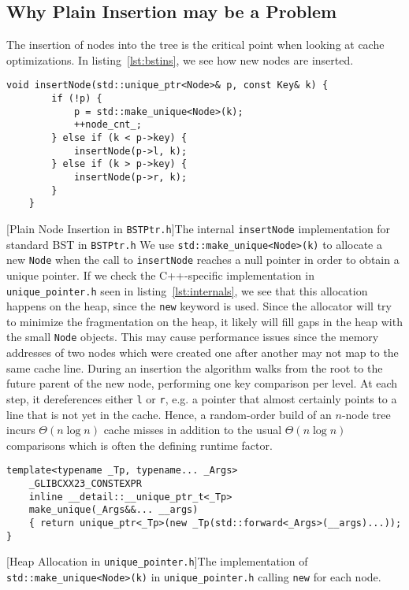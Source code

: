 \documentclass{article}
\begin{document}
\subsection{Why Plain Insertion may be a Problem}
The insertion of nodes into the tree is the critical point when looking at cache optimizations. In listing~\ref{lst:bstins}, we see how new nodes are inserted. 
\begin{lstlisting}
void insertNode(std::unique_ptr<Node>& p, const Key& k) {
        if (!p) {
            p = std::make_unique<Node>(k);
            ++node_cnt_;                         
        } else if (k < p->key) {
            insertNode(p->l, k);
        } else if (k > p->key) {
            insertNode(p->r, k);
        }
    }
\end{lstlisting}
[Plain Node Insertion in \texttt{BSTPtr.h}]{The internal \texttt{insertNode} implementation for standard BST in \texttt{BSTPtr.h}}
\label{lst:bstins}
We use \texttt{std::make\_unique<Node>(k)} to allocate a new \texttt{Node} when the call to \texttt{insertNode} reaches a null pointer in order to obtain a unique pointer. If we check the C++-specific implementation in \texttt{unique\_pointer.h} seen in listing~\ref{lst:internals}, we see that this allocation happens on the heap, since the \texttt{new} keyword is used. Since the allocator will try to minimize the fragmentation on the heap, it likely will fill gaps in the heap with the small \texttt{Node} objects. This may cause performance issues since the memory addresses of two nodes which were created one after another may not map to the same cache line. During an insertion the algorithm walks from the root to the future parent of the new node, performing one key comparison per level.  At each step, it dereferences either \texttt{l} or \texttt{r}, e.g. a pointer that almost certainly points to a line that is not yet in the cache.  Hence, a random-order build of an $n$-node tree incurs $\Theta(n \log n)$ cache misses in addition to the usual $\Theta(n \log n)$ comparisons which is often the defining runtime factor.



\begin{lstlisting}
template<typename _Tp, typename... _Args>
    _GLIBCXX23_CONSTEXPR
    inline __detail::__unique_ptr_t<_Tp>
    make_unique(_Args&&... __args)
    { return unique_ptr<_Tp>(new _Tp(std::forward<_Args>(__args)...)); }
\end{lstlisting}
[Heap Allocation in \texttt{unique\_pointer.h}]{The implementation of \texttt{std::make\_unique<Node>(k)} in \texttt{unique\_pointer.h} calling \texttt{new} for each node.}
\label{lst:internals}
\end{document}

